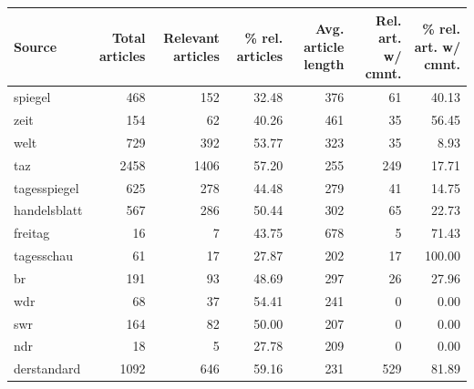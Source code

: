 \begin{table}
	\begin{tabular}{lrrrrrr}
		\toprule
		Source             & Total articles & Relevant articles & \% rel. articles & Avg. article length\footnotemark[1] & Rel. art. w/ cmnt. & \% rel. art. w/ cmnt. \\ \midrule
		spiegel            &            468 &               152 &            32.48 &                 376 &                 61 &                 40.13 \\
		zeit               &            154 &                62 &            40.26 &                 461 &                 35 &                 56.45 \\
		welt               &            729 &               392 &            53.77 &                 323 &                 35 &                  8.93 \\
		taz                &           2458 &              1406 &            57.20 &                 255 &                249 &                 17.71 \\
		tagesspiegel       &            625 &               278 &            44.48 &                 279 &                 41 &                 14.75 \\
		handelsblatt       &            567 &               286 &            50.44 &                 302 &                 65 &                 22.73 \\
		freitag            &             16 &                 7 &            43.75 &                 678 &                  5 &                 71.43 \\
		tagesschau         &             61 &                17 &            27.87 &                 202 &                 17 &                100.00 \\
		br                 &            191 &                93 &            48.69 &                 297 &                 26 &                 27.96 \\
		wdr                &             68 &                37 &            54.41 &                 241 &                  0 &                  0.00 \\
		swr                &            164 &                82 &            50.00 &                 207 &                  0 &                  0.00 \\
		ndr                &             18 &                 5 &            27.78 &                 209 &                  0 &                  0.00 \\
		derstandard        &           1092 &               646 &            59.16 &                 231 &                529 &                 81.89 \\

\end{tabular}
\end{table}
